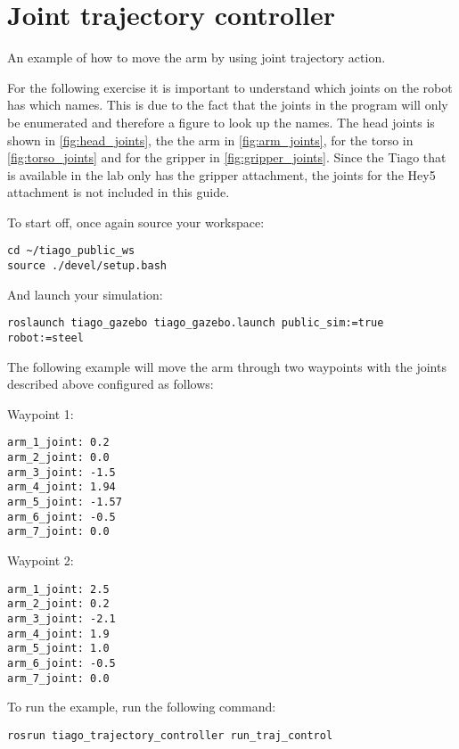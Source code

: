 \section{Joint trajectory controller}
An example of how to move the arm by using joint trajectory action.



For the following exercise it is important to understand which joints on the robot has which names. This is due to the fact that the joints in the program will only be enumerated and therefore a figure to look up the names. The head joints is shown in \autoref{fig:head_joints}, the the arm in \autoref{fig:arm_joints}, for the torso in \autoref{fig:torso_joints} and for the gripper in \autoref{fig:gripper_joints}. Since the Tiago that is available in the lab only has the gripper attachment, the joints for the Hey5 attachment is not included in this guide. 


To start off, once again source your workspace:

\begin{verbatim}
cd ~/tiago_public_ws
source ./devel/setup.bash
\end{verbatim}

And launch your simulation:

\begin{verbatim}
roslaunch tiago_gazebo tiago_gazebo.launch public_sim:=true robot:=steel
\end{verbatim}

The following example will move the arm through two waypoints with the joints described above configured as follows:

Waypoint 1:
\begin{verbatim}
arm_1_joint: 0.2
arm_2_joint: 0.0
arm_3_joint: -1.5
arm_4_joint: 1.94
arm_5_joint: -1.57
arm_6_joint: -0.5
arm_7_joint: 0.0
\end{verbatim} 

Waypoint 2:
\begin{verbatim}
arm_1_joint: 2.5
arm_2_joint: 0.2
arm_3_joint: -2.1
arm_4_joint: 1.9
arm_5_joint: 1.0
arm_6_joint: -0.5
arm_7_joint: 0.0
\end{verbatim} 

To run the example, run the following command:

\begin{verbatim}
rosrun tiago_trajectory_controller run_traj_control
\end{verbatim}




%



\iffalse
\begin{verbatim}
\end{verbatim}
\fi
